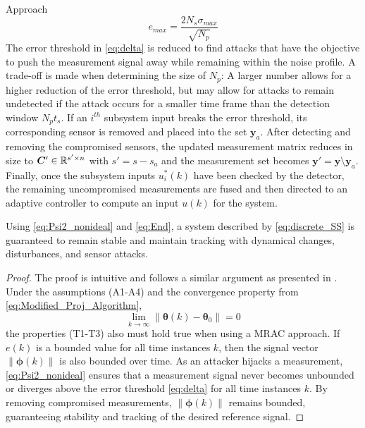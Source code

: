 \begin{section}{Approach}
    \begin{equation}
	    \label{eq:max_error2}
	    e_{max} = \frac{2N_s\sigma_{max}}{\sqrt{N_p}}
	\end{equation}
The error threshold in \eqref{eq:delta} is reduced to find attacks that have the objective to push the measurement signal away while remaining within the noise profile. A trade-off is made when determining the size of $N_p$: A larger number allows for a higher reduction of the error threshold, but may allow for attacks to remain undetected if the attack occurs for a smaller time frame than the detection window $N_pt_s$. If an $i^{th}$ subsystem input breaks the error threshold, its corresponding sensor is removed and placed into the set $\bm{y}_a$. After detecting and removing the compromised sensors, the updated measurement matrix reduces in size to $\bm{C}' \in \mathbb{R}^{s' \times n}$ with $s'=s-s_a$ and the measurement set becomes $\bm{y}' =\bm{y}\setminus\bm{y}_a$. Finally, once the subsystem inputs $u_i^*(k)$ have been checked by the detector, the remaining uncompromised measurements are fused and then directed to an adaptive controller to compute an input $u(k)$ for the system.

\begin{lemma} 
	\label{lemma_1}
	Using \eqref{eq:Psi2_nonideal} and \eqref{eq:End}, a system described by \eqref{eq:discrete_SS} is guaranteed to remain stable and maintain tracking with dynamical changes, disturbances, and sensor attacks. 

\end{lemma}

\begin{proof}
The proof is intuitive and follows a similar argument as presented in \cite{tao2003adaptive}. Under the assumptions (A1-A4) and the convergence property from \eqref{eq:Modified_Proj_Algorithm},
    \begin{equation}
    \label{lemma_1_eq1}
        \lim_{k\to\infty}\|\bm{\theta}(k)-\bm{\theta}_0\|=0 \nonumber
    \end{equation}
the properties (T1-T3) also must hold true when using a MRAC approach. If $e(k)$ is a bounded value for all time instances $k$, then the signal vector $\lVert{\bm{\phi}}(k) \rVert$ is also bounded over time. As an attacker hijacks a measurement, \eqref{eq:Psi2_nonideal} ensures that a measurement signal never becomes unbounded or diverges above the error threshold \eqref{eq:delta} for all time instances $k$. By removing compromised measurements, $\lVert{\bm{\phi}}(k) \rVert$ remains bounded, guaranteeing stability and tracking of the desired reference signal.
  

\end{proof}
\end{section}
